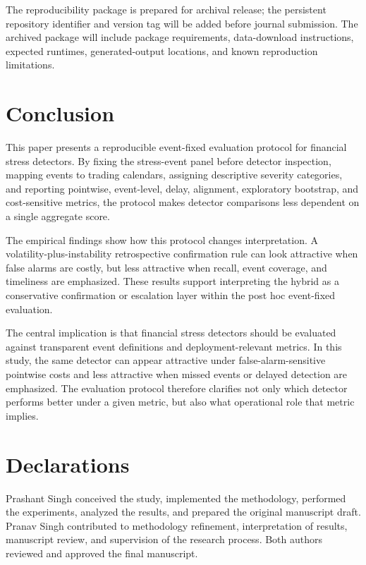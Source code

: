 \documentclass[pdflatex,sn-mathphys-num]{sn-jnl}
\begin{document}
The reproducibility package is prepared for archival release; the persistent repository identifier and version tag will be added before journal submission. The archived package will include package requirements, data-download instructions, expected runtimes, generated-output locations, and known reproduction limitations.

\section{Conclusion}
This paper presents a reproducible event-fixed evaluation protocol for financial stress detectors. By fixing the stress-event panel before detector inspection, mapping events to trading calendars, assigning descriptive severity categories, and reporting pointwise, event-level, delay, alignment, exploratory bootstrap, and cost-sensitive metrics, the protocol makes detector comparisons less dependent on a single aggregate score.

The empirical findings show how this protocol changes interpretation. A volatility-plus-instability retrospective confirmation rule can look attractive when false alarms are costly, but less attractive when recall, event coverage, and timeliness are emphasized. These results support interpreting the hybrid as a conservative confirmation or escalation layer within the post hoc event-fixed evaluation.

The central implication is that financial stress detectors should be evaluated against transparent event definitions and deployment-relevant metrics. In this study, the same detector can appear attractive under false-alarm-sensitive pointwise costs and less attractive when missed events or delayed detection are emphasized. The evaluation protocol therefore clarifies not only which detector performs better under a given metric, but also what operational role that metric implies.

\backmatter

\section*{Declarations}

Prashant Singh conceived the study, implemented the methodology, performed the experiments, analyzed the results, and prepared the original manuscript draft. Pranav Singh contributed to methodology refinement, interpretation of results, manuscript review, and supervision of the research process. Both authors reviewed and approved the final manuscript.
\end{document}
